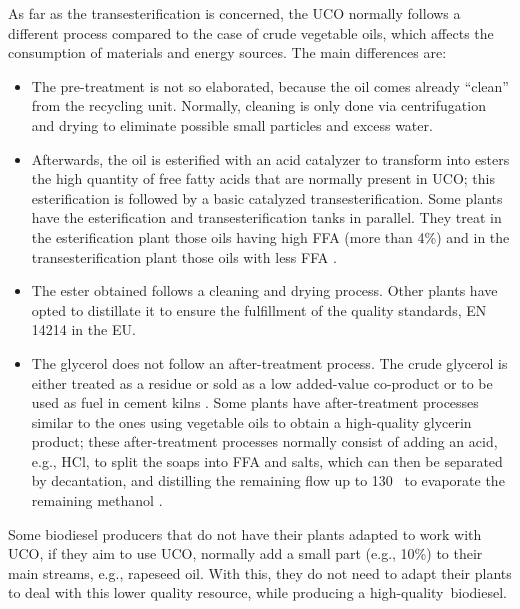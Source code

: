 \documentclass[sustainability,article,accept,moreauthors,pdftex,12pt,a4paper]{mdpi}
\newcommand{\degreeC}[1]{#1~\textcelsius}
\begin{document}
As far as the transesterification is concerned, the UCO normally follows a different process compared to the case of crude vegetable oils, which affects the consumption of materials and energy sources. The main differences are:
\begin{itemize}
\vspace{6pt}
\item The pre-treatment is not so elaborated, because the oil comes already ``clean'' from the recycling unit. Normally, cleaning is only done via centrifugation and drying to eliminate possible small particles and excess water.
\item Afterwards, the oil is esterified with an acid catalyzer to transform into esters the high quantity of free fatty acids that are normally present in UCO; this esterification is followed by a basic catalyzed transesterification. Some plants have the esterification and transesterification tanks in parallel. They treat in the esterification plant those oils having high FFA (more than 4\%) and in the transesterification plant those oils with less FFA \cite{CIEMAT2005}.
\item The ester obtained follows a cleaning and drying process. Other plants have opted to distillate it to ensure the fulfillment of the quality standards, EN 14214 \cite{CENEN14214} in the EU.
\item The glycerol does not follow an after-treatment process. The crude glycerol is either treated as a residue or sold as a low added-value co-product or to be used as fuel in cement kilns \cite{FontdeMoraThesis2013}. Some plants have after-treatment processes similar to the ones using vegetable oils to obtain a high-quality glycerin product; these after-treatment processes normally consist of adding an acid, e.g., HCl, to split the soaps into FFA and salts, which can then be separated by decantation, and distilling the remaining flow up to \degreeC{130} to evaporate the remaining methanol \cite{FontdeMoraThesis2013}.
\vspace{6pt}
\end{itemize}

Some biodiesel producers that do not have their plants adapted to work with UCO, if they aim to use UCO, normally add a small part (e.g., 10\%) to their main streams, e.g., rapeseed oil. With this, they do not need to adapt their plants to deal with this lower quality resource, while producing a high-quality~biodiesel.
\end{document}
